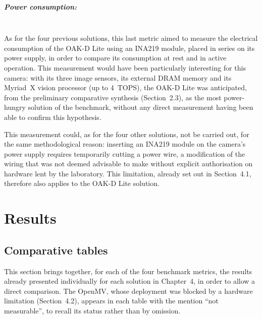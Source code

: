 \documentclass[12pt,a4paper]{report}
\begin{document}
	\paragraph{Power consumption:} \mbox{} \\
	As for the four previous solutions, this last metric aimed to measure the electrical consumption of the OAK-D Lite using an INA219 module, placed in series on its power supply, in order to compare its consumption at rest and in active operation. This measurement would have been particularly interesting for this camera: with its three image sensors, its external DRAM memory and its Myriad~X vision processor (up to 4~TOPS), the OAK-D Lite was anticipated, from the preliminary comparative synthesis (Section~2.3), as the most power-hungry solution of the benchmark, without any direct measurement having been able to confirm this hypothesis.
	
	This measurement could, as for the four other solutions, not be carried out, for the same methodological reason: inserting an INA219 module on the camera's power supply requires temporarily cutting a power wire, a modification of the wiring that was not deemed advisable to make without explicit authorisation on hardware lent by the laboratory. This limitation, already set out in Section~4.1, therefore also applies to the OAK-D Lite solution.
	
	\newpage
	
	
	\chapter{Results}
	
	
	\section{Comparative tables}
	
	This section brings together, for each of the four benchmark metrics, the results already presented individually for each solution in Chapter~4, in order to allow a direct comparison. The OpenMV, whose deployment was blocked by a hardware limitation (Section~4.2), appears in each table with the mention ``not measurable'', to recall its status rather than by omission.
	
\end{document}
